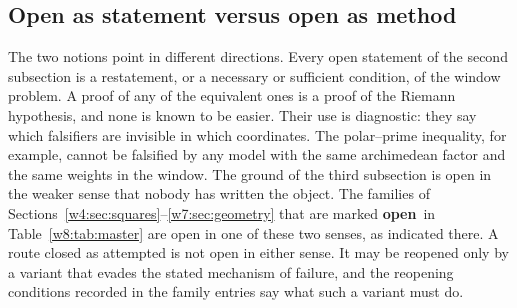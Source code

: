 \documentclass[11pt]{amsart}
\theoremstyle{definition}
\theoremstyle{remark}
\numberwithin{equation}{section}
\newcommand{\rtag}[1]{\textbf{\small\textsf{#1}}}
\newcommand{\openR}{\rtag{open}}
\begin{document}
\subsection{Open as statement versus open as method}

The two notions point in different directions. Every open statement of the second subsection is a restatement, or a
necessary or sufficient condition, of the window problem. A proof of any of the equivalent ones is a proof of the
Riemann hypothesis, and none is known to be easier. Their use is diagnostic: they say which falsifiers are invisible
in which coordinates. The polar--prime inequality, for example, cannot be falsified by any model with the same
archimedean factor and the same weights in the window. The ground of the third subsection is open in the weaker sense
that nobody has written the object. The families of Sections~\ref{w4:sec:squares}--\ref{w7:sec:geometry} that are
marked \openR\ in Table~\ref{w8:tab:master} are open in one of these two senses, as indicated there. A route closed as
attempted is not open in either sense. It may be reopened only by a variant that evades the stated mechanism of
failure, and the reopening conditions recorded in the family entries say what such a variant must do.
\end{document}
